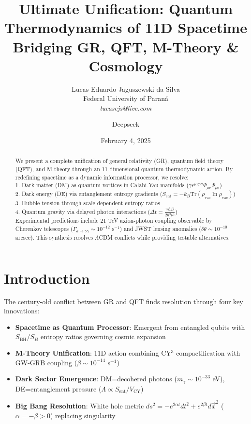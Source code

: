 \documentclass[12pt, a4paper]{article}
\title{Ultimate Unification: Quantum Thermodynamics of 11D Spacetime \\ Bridging GR, QFT, M-Theory \& Cosmology}
\author{Lucas Eduardo Jaguszewski da Silva \\ Federal University of Paraná \\ \textit{lucasejs@live.com} \and Deepseek}
\date{February 4, 2025}
\begin{document}
\maketitle

\begin{abstract}
We present a complete unification of general relativity (GR), quantum field theory (QFT), and M-theory through an 11-dimensional quantum thermodynamic action. By redefining spacetime as a dynamic information processor, we resolve: \\
1. Dark matter (DM) as quantum vortices in Calabi-Yau manifolds ($\gamma\epsilon^{\mu\nu\rho\sigma}\Psi_{\mu\nu}\Psi_{\rho\sigma}$) \\
2. Dark energy (DE) via entanglement entropy gradients ($S_{\text{ent}} = -k_B\text{Tr}(\rho_{\text{vac}}\ln\rho_{\text{vac}})$) \\
3. Hubble tension through scale-dependent entropy ratios \\
4. Quantum gravity via delayed photon interactions ($\Delta t = \frac{m_\gamma^2D}{2\hbar^2\nu^2}$) \\
Experimental predictions include 21 TeV axion-photon coupling observable by Cherenkov telescopes ($\Gamma_{a\to\gamma\gamma} \sim 10^{-12}$ s$^{-1}$) and JWST lensing anomalies ($\delta\theta \sim 10^{-10}$ arcsec). This synthesis resolves $\Lambda$CDM conflicts while providing testable alternatives.
\end{abstract}

\section{Introduction}
The century-old conflict between GR and QFT finds resolution through four key innovations:

\begin{itemize}
\item \textbf{Spacetime as Quantum Processor}: Emergent from entangled qubits with $S_{\text{BH}}/S_B$ entropy ratios governing cosmic expansion
\item \textbf{M-Theory Unification}: 11D action combining CY$^3$ compactification with GW-GRB coupling ($\beta\sim10^{-14}$ s$^{-1}$)
\item \textbf{Dark Sector Emergence}: DM=decohered photons ($m_\gamma\sim10^{-33}$ eV), DE=entanglement pressure ($\Lambda\propto S_{\text{ent}}/V_{\text{CY}}$)
\item \textbf{Big Bang Resolution}: White hole metric $ds^2 = -e^{2\alpha t}dt^2 + e^{2\beta t}d\vec{x}^2$ ($\alpha=-\beta>0$) replacing singularity
\end{itemize}
\end{document}
